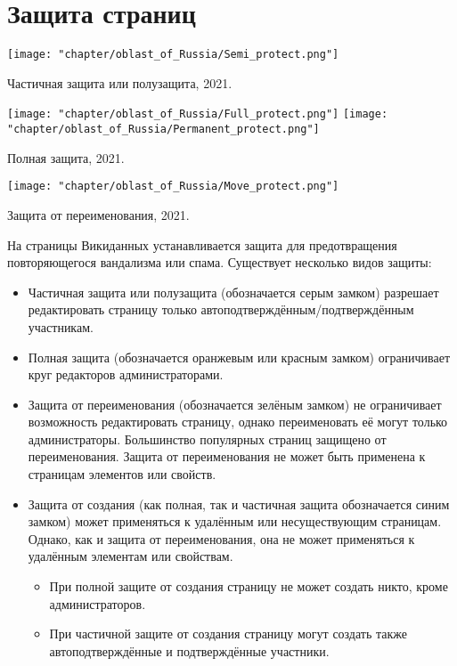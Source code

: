\section{Защита страниц}

\begin{marginfigure}[5.0cm]
{
	\setlength{\fboxsep}{0pt}%
	\setlength{\fboxrule}{1pt}%
	{\texttt{[image: "chapter/oblast\_of\_Russia/Semi\_protect.png"]}}
}
\caption []{Частичная защита или полузащита, 2021.}%
\label{fig:legend_population}%
\end{marginfigure}

\begin{marginfigure}[0.0cm]
{
	\setlength{\fboxsep}{0pt}%
	\setlength{\fboxrule}{1pt}%
	{\texttt{[image: "chapter/oblast\_of\_Russia/Full\_protect.png"]}}
	{\texttt{[image: "chapter/oblast\_of\_Russia/Permanent\_protect.png"]}}
}
\caption []{Полная защита, 2021.}%
\label{fig:legend_population}%
\end{marginfigure}

\begin{marginfigure}[0.0cm]
{
	\setlength{\fboxsep}{0pt}%
	\setlength{\fboxrule}{1pt}%
	{\texttt{[image: "chapter/oblast\_of\_Russia/Move\_protect.png"]}}
}
\caption []{Защита от переименования, 2021.}%
\label{fig:legend_population}%
\end{marginfigure}

На страницы Викиданных устанавливается защита для предотвращения повторяющегося вандализма или спама. Существует несколько видов защиты:
\begin{itemize}
  \item Частичная защита или полузащита (обозначается серым замком) разрешает редактировать страницу только автоподтверждённым/подтверждённым участникам.
  \item Полная защита (обозначается оранжевым или красным замком) ограничивает круг редакторов администраторами.
  \item Защита от переименования (обозначается зелёным замком) не ограничивает возможность редактировать страницу, однако переименовать её могут только администраторы. Большинство популярных страниц защищено от переименования. Защита от переименования не может быть применена к страницам элементов или свойств.
  \item Защита от создания (как полная, так и частичная защита обозначается синим замком) может применяться к удалённым или несуществующим страницам. Однако, как и защита от переименования, она не может применяться к удалённым элементам или свойствам.
  \begin{itemize}
	\item При полной защите от создания страницу не может создать никто, кроме администраторов.
	\item При частичной защите от создания страницу могут создать также автоподтверждённые и подтверждённые участники.
  \end{itemize}
\end{itemize}

